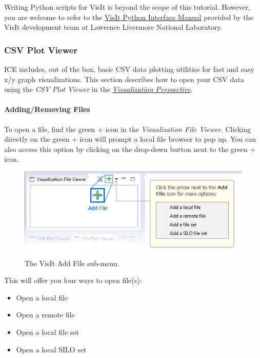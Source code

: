 Writing Python scripts for VisIt is beyond the scope of this tutorial.
However, you are welcome to refer to the
\href{https://wci.llnl.gov/simulation/computer-codes/visit/manuals}{VisIt
Python Interface Manual} provided by the VisIt development team at
Lawrence Livermore National Laboratory.

\subsubsection{CSV Plot Viewer}\label{csv-plot-viewer}

ICE includes, out of the box, basic CSV data plotting utilities for fast
and easy x/y graph visualizations. This section describes how to open
your CSV data using the \emph{CSV Plot Viewer} in the
\emph{\hyperref[Visualizationux5fPerspective]{Visualization
Perspective}}.

\paragraph{Adding/Removing Files}\label{addingremoving-files-1}

To open a file, find the green + icon in the \emph{Visualization File
Viewer}. Clicking directly on the green + icon will prompt a local
file browser to pop up. You can also access this option by clicking on
the drop-down button next to the green + icon.

\begin{figure}[htbp]
\centering
\includegraphics[width=\textwidth]{figures/ICE_VisItAddFileButton.png}
\caption{The VisIt Add File sub-menu.}
\end{figure}

This will offer you four ways to open file(s):

\begin{itemize}
\itemsep1pt\parskip0pt
\item
  Open a local file
\item
  Open a remote file
\item
  Open a local file set
\item
  Open a local SILO set
\end{itemize}

